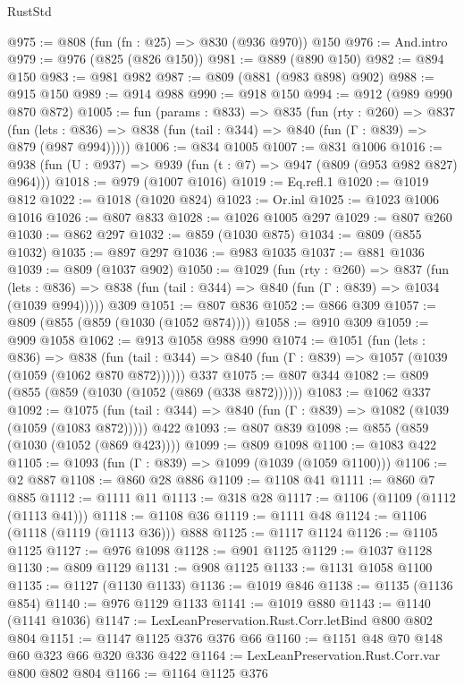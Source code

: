 \begin{lexlean}{RustStd}
\begin{coremodule}
@975 := @808 (fun (fn : @25) => @830 (@936 @970)) @150
@976 := And.intro
@979 := @976 (@825 (@826 @150))
@981 := @889 (@890 @150)
@982 := @894 @150
@983 := @981 @982
@987 := @809 (@881 (@983 @898) @902)
@988 := @915 @150
@989 := @914 @988
@990 := @918 @150
@994 := @912 (@989 @990 @870 @872)
@1005 := fun (params : @833) =>
  @835
    (fun (rty : @260) =>
    @837
      (fun (lets : @836) => @838 (fun (tail : @344) => @840 (fun (Γ : @839) => @879 (@987 @994)))))
@1006 := @834 @1005
@1007 := @831 @1006
@1016 := @938 (fun (U : @937) => @939 (fun (t : @7) => @947 (@809 (@953 @982 @827) @964)))
@1018 := @979 (@1007 @1016)
@1019 := Eq.refl.{1}
@1020 := @1019 @812
@1022 := @1018 (@1020 @824)
@1023 := Or.inl
@1025 := @1023 @1006 @1016
@1026 := @807 @833
@1028 := @1026 @1005 @297
@1029 := @807 @260
@1030 := @862 @297
@1032 := @859 (@1030 @875)
@1034 := @809 (@855 @1032)
@1035 := @897 @297
@1036 := @983 @1035
@1037 := @881 @1036
@1039 := @809 (@1037 @902)
@1050 := @1029
    (fun (rty : @260) =>
    @837
      (fun (lets : @836) =>
      @838 (fun (tail : @344) => @840 (fun (Γ : @839) => @1034 (@1039 @994)))))
    @309
@1051 := @807 @836
@1052 := @866 @309
@1057 := @809 (@855 (@859 (@1030 (@1052 @874))))
@1058 := @910 @309
@1059 := @909 @1058
@1062 := @913 @1058 @988 @990
@1074 := @1051
    (fun (lets : @836) =>
    @838 (fun (tail : @344) => @840 (fun (Γ : @839) => @1057 (@1039 (@1059 (@1062 @870 @872))))))
    @337
@1075 := @807 @344
@1082 := @809 (@855 (@859 (@1030 (@1052 (@869 (@338 @872))))))
@1083 := @1062 @337
@1092 := @1075
    (fun (tail : @344) => @840 (fun (Γ : @839) => @1082 (@1039 (@1059 (@1083 @872)))))
    @422
@1093 := @807 @839
@1098 := @855 (@859 (@1030 (@1052 (@869 @423))))
@1099 := @809 @1098
@1100 := @1083 @422
@1105 := @1093 (fun (Γ : @839) => @1099 (@1039 (@1059 @1100)))
@1106 := @2 @887
@1108 := @860 @28 @886
@1109 := @1108 @41
@1111 := @860 @7 @885
@1112 := @1111 @11
@1113 := @318 @28
@1117 := @1106 (@1109 (@1112 (@1113 @41)))
@1118 := @1108 @36
@1119 := @1111 @48
@1124 := @1106 (@1118 (@1119 (@1113 @36))) @888
@1125 := @1117 @1124
@1126 := @1105 @1125
@1127 := @976 @1098
@1128 := @901 @1125
@1129 := @1037 @1128
@1130 := @809 @1129
@1131 := @908 @1125
@1133 := @1131 @1058 @1100
@1135 := @1127 (@1130 @1133)
@1136 := @1019 @846
@1138 := @1135 (@1136 @854)
@1140 := @976 @1129 @1133
@1141 := @1019 @880
@1143 := @1140 (@1141 @1036)
@1147 := LexLeanPreservation.Rust.Corr.letBind @800 @802 @804
@1151 := @1147 @1125 @376 @376 @66
@1160 := @1151 @48 @70 @148 @60 @323 @66 @320 @336 @422
@1164 := LexLeanPreservation.Rust.Corr.var @800 @802 @804
@1166 := @1164 @1125 @376

\end{coremodule}
\end{lexlean}
